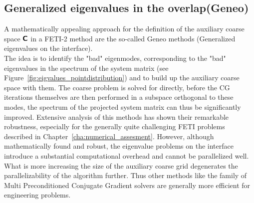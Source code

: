 \subsection{Generalized eigenvalues in the overlap(Geneo)}
A mathematically appealing approach for the definition of the auxiliary coarse space $\boldsymbol{\mathsf{C}}$ in a FETI-2 method are the so-called Geneo methods (Generalized eigenvalues on the interface).\\ The idea is to identify the "bad" eigenmodes, corresponding to the "bad" eigenvalues in the spectrum of the system matrix (see Figure~\ref{fig:eigvalues_pointdistribution}) and to build up the auxiliary coarse space with them. The coarse problem is solved for directly, before the CG iterations themselves are then performed in a subspace orthogonal to these modes, the spectrum of the projected system matrix can thus be significantly improved. Extensive analysis of this methods\cite{Spillane2016}\cite{Spillane2013}\cite{Spillane2014} has shown their remarkable robustness, especially for the generally quite challenging FETI problems described in Chapter~\ref{cha:numerical_assesment}. However, although mathematically found and robust, the eigenvalue problems on the interface introduce a substantial computational overhead and cannot be parallelized well. What is more increasing the size of the auxiliary coarse grid degenerates the parallelizability of the algorithm further. Thus other methods like the family of Multi Preconditioned Conjugate Gradient solvers are generally more efficient for engineering problems.

